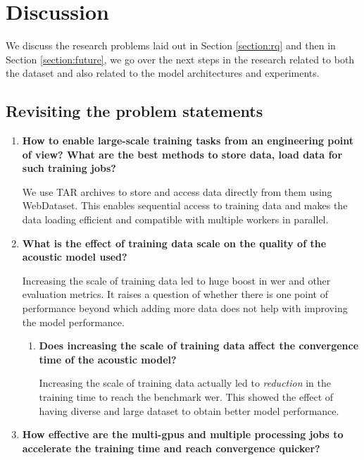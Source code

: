 \chapter{Discussion}
\label{chapter:discussion}
We discuss the research problems laid out in Section \ref{section:rq} and then in Section \ref{section:future}, we go over the next steps in the research related to both the dataset and also related to the model architectures and experiments.

\section{Revisiting the problem statements}

\begin{enumerate}
  \item \textbf{How to enable large-scale training tasks from an engineering point of view? What are the best  methods  to  store data, load data for such training jobs?}
  
  We use TAR archives to store and access data directly from them using WebDataset. This enables sequential access to training data and makes the data loading efficient and compatible with multiple workers in parallel. 
  
  \item \textbf{What is the effect of training data scale on the quality of the acoustic model used?}
  
  Increasing the scale of training data led to huge boost in \acrshort{wer} and other evaluation metrics. It raises a question of whether there is one point of performance beyond which adding more data does not help with improving the model performance. 
  
    \begin{enumerate}
        \item \textbf{Does increasing the scale of training data affect the convergence time of the acoustic model?}
        
        Increasing the scale of training data actually led to \emph{reduction} in the training time to reach the benchmark \acrshort{wer}. This showed the effect of having diverse and large dataset to obtain better model performance.
    \end{enumerate}
    
    
  \item \textbf{How effective are the multi-\acrshort{gpu}s and multiple processing jobs to accelerate the training time and reach convergence quicker? }
    

\end{enumerate}
